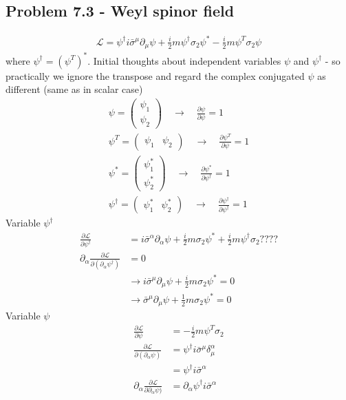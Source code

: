 \documentclass[../main.tex]{subfiles}
\begin{document}
\subsection{Problem 7.3 - Weyl spinor field}
\begin{align}
\mathcal{L}=\psi^\dagger i\bar{\sigma}^\mu\partial_\mu\psi+\frac{i}{2}m\psi^\dagger\sigma_2\psi^*-\frac{i}{2}m\psi^T\sigma_2\psi
\end{align}
where $\psi^\dagger=(\psi^T)^*$. Initial thoughts about independent variables $\psi$ and $\psi^\dagger$ - so practically we ignore the transpose and regard the complex conjugated $\psi$ as different (same as in scalar case)
\begin{align}
\psi=\left(
\begin{matrix}
\psi_1\\
\psi_2
\end{matrix}
\right)\quad\rightarrow\quad\frac{\partial\psi}{\partial\psi}=1\\
\psi^T=\left(
\begin{matrix}
\psi_1 & \psi_2
\end{matrix}
\right)\quad\rightarrow\quad\frac{\partial\psi^T}{\partial\psi}=1\\
\psi^*=\left(
\begin{matrix}
\psi_1^* \\
 \psi_2^*
\end{matrix}
\right)\quad\rightarrow\quad\frac{\partial\psi^*}{\partial\psi^\dagger}=1\\
\psi^\dagger=\left(
\begin{matrix}
\psi_1^* & \psi_2^*
\end{matrix}
\right)\quad\rightarrow\quad\frac{\partial\psi^\dagger}{\partial\psi^\dagger}=1
\end{align}
Variable $\psi^\dagger$ 
\begin{align}
\frac{\partial\mathcal{L}}{\partial\psi^\dagger}
&=i\bar{\sigma}^\alpha\partial_\alpha\psi+\frac{i}{2}m\sigma_2\psi^*+\frac{i}{2}m\psi^\dagger\sigma_2????\\
\partial_\alpha\frac{\partial\mathcal{L}}{\partial(\partial_\alpha\psi^\dagger)}
&=0\\
&\rightarrow i\bar{\sigma}^\mu\partial_\mu\psi+\frac{i}{2}m\sigma_2\psi^*=0\\
&\rightarrow \bar{\sigma}^\mu\partial_\mu\psi+\frac{1}{2}m\sigma_2\psi^*=0
\end{align}
Variable $\psi$
\begin{align}
\frac{\partial\mathcal{L}}{\partial\psi}
&=-\frac{i}{2}m\psi^T\sigma_2\\
\frac{\partial\mathcal{L}}{\partial(\partial_\alpha\psi)}
&=\psi^\dagger i\bar{\sigma}^\mu\delta^\alpha_\mu\\
&=\psi^\dagger i\bar{\sigma}^\alpha\\
\partial_\alpha\frac{\partial\mathcal{L}}{\partial\partial_\alpha\psi)}
&=\partial_\alpha\psi^\dagger i\bar{\sigma}^\alpha\\
\end{align}
\end{document}
